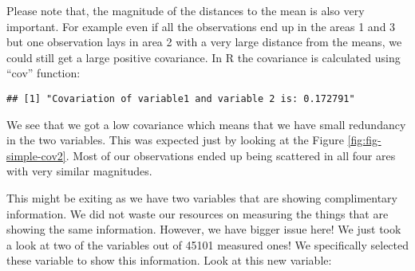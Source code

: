 \documentclass[
]{book}
\newenvironment{Shaded}{\begin{snugshade}}{\end{snugshade}}
\newcommand{\CommentTok}[1]{\textcolor[rgb]{0.56,0.35,0.01}{\textit{#1}}}
\newcommand{\DecValTok}[1]{\textcolor[rgb]{0.00,0.00,0.81}{#1}}
\newcommand{\KeywordTok}[1]{\textcolor[rgb]{0.13,0.29,0.53}{\textbf{#1}}}
\newcommand{\NormalTok}[1]{#1}
\newcommand{\StringTok}[1]{\textcolor[rgb]{0.31,0.60,0.02}{#1}}
\theoremstyle{definition}
\theoremstyle{definition}
\theoremstyle{definition}
\theoremstyle{remark}
\begin{document}
Please note that, the magnitude of the distances to the mean is also very important. For example even if all the observations end up in the areas 1 and 3 but one observation lays in area 2 with a very large distance from the means, we could still get a large positive covariance. In R the covariance is calculated using ``cov'' function:

\begin{Shaded}
\end{Shaded}

\begin{verbatim}
## [1] "Covariation of variable1 and variable 2 is: 0.172791"
\end{verbatim}

We see that we got a low covariance which means that we have small redundancy in the two variables. This was expected just by looking at the Figure \ref{fig:fig-simple-cov2}. Most of our observations ended up being scattered in all four ares with very similar magnitudes.

This might be exiting as we have two variables that are showing complimentary information. We did not waste our resources on measuring the things that are showing the same information. However, we have bigger issue here! We just took a look at two of the variables out of 45101 measured ones! We specifically selected these variable to show this information. Look at this new variable:
\end{document}
